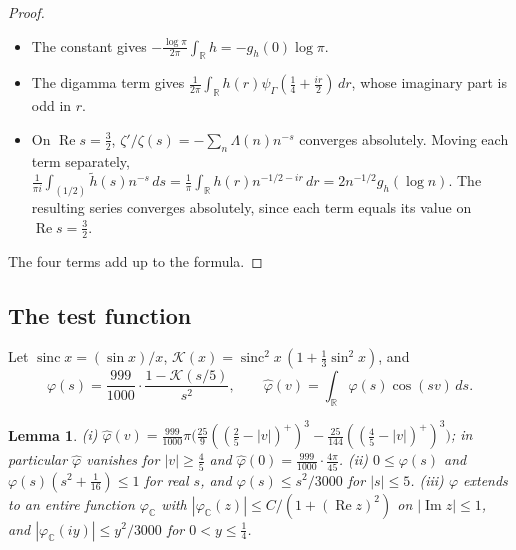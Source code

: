 \documentclass[11pt]{article}
\newtheorem{lemma}[theorem]{Lemma}
\theoremstyle{definition}
\newcommand{\sinc}{\operatorname{sinc}}
\begin{document}
\begin{proof}
\begin{itemize}
residue $\tilde h(1) = h(-\frac i2)$. On the line $\frac1s +
\frac{1}{s - 1} = -2ir/(r^2 + \frac14)$ is odd in $r$, so the first two terms give $2h(-\frac i2) = h(\frac i2) +
h(-\frac i2)$.
\item The constant gives $-\frac{\log\pi}{2\pi} \int_{\mathbb R} h = -g_h(0)\log\pi$.
\item The digamma term gives $\frac{1}{2\pi} \int_{\mathbb R} h(r)\psi_\Gamma(\frac14 + \frac{ir}2)\,dr$, whose
imaginary part is odd in $r$.
\item On $\operatorname{Re} s = \frac32$, $\zeta'/\zeta(s) =
-\sum_n \Lambda(n) n^{-s}$ converges absolutely. Moving each
term separately, $\frac{1}{\pi i} \int_{(1/2)} \tilde h(s)
n^{-s}\,ds = \frac1\pi \int_{\mathbb R} h(r) n^{-1/2 - ir}\,dr =
2n^{-1/2} g_h(\log n)$. The resulting series converges absolutely, since each term equals its value on
$\operatorname{Re} s = \frac32$.
\end{itemize}
The four terms add up to the formula.
\end{proof}

\subsection{The test function}

Let $\sinc x = (\sin x)/x$, $\mathcal K(x) = \sinc^2 x\,(1 + \frac13 \sin^2 x)$, and
\[
\varphi(s) = \frac{999}{1000} \cdot \frac{1 - \mathcal K(s/5)}{s^2}, \qquad \hat\varphi(v) = \int_{\mathbb R}
\varphi(s) \cos(sv)\,ds.
\]

\begin{lemma}\label{lem:phi}
\textup{(i)} $\hat\varphi(v) = \frac{999}{1000}\pi\big(\frac{25}{9}((\frac25 - |v|)^+)^3 - \frac{25}{144}((\frac45 -
|v|)^+)^3\big)$; in particular $\hat\varphi$ vanishes for $|v| \ge \frac45$ and $\hat\varphi(0) = \frac{999}{1000}
\cdot \frac{4\pi}{45}$. \textup{(ii)} $0 \le \varphi(s)$ and $\varphi(s)(s^2 + \frac1{16}) \le 1$ for real $s$, and
$\varphi(s) \le s^2/3000$ for $|s| \le 5$. \textup{(iii)} $\varphi$ extends to an entire function $\varphi_{\mathbb C}$
with $|\varphi_{\mathbb C}(z)| \le C/(1 + (\operatorname{Re} z)^2)$ on $|\operatorname{Im} z| \le 1$, and
$|\varphi_{\mathbb C}(iy)| \le y^2/3000$ for $0 < y \le \frac14$.
\end{lemma}
\end{document}
